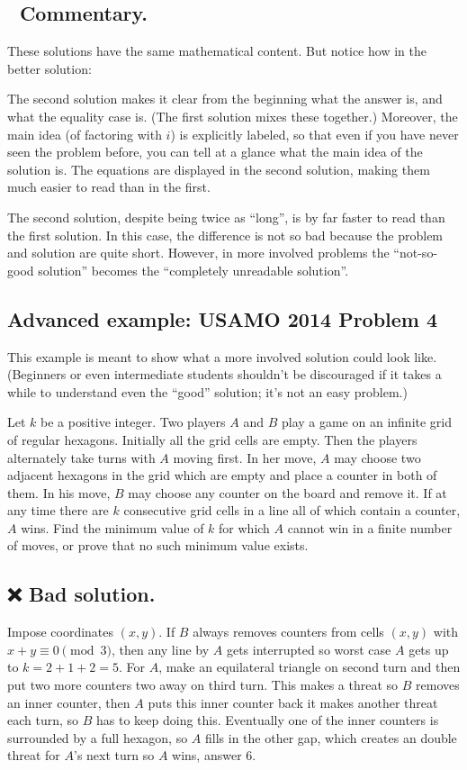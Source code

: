 \documentclass[11pt]{scrartcl}
\begin{document}
\subsection*{💬 Commentary.}
These solutions have the same mathematical content.
But notice how in the better solution:
\begin{itemize}
  \ii The second solution makes it clear
  from the beginning what the answer is, and what the equality case is.
  (The first solution mixes these together.)
  \ii Moreover, the main idea (of factoring with $i$) is explicitly labeled,
  so that even if you have never seen the problem before,
  you can tell at a glance what the main idea of the solution is.
  \ii The equations are displayed in the second solution,
  making them much easier to read than in the first.
\end{itemize}
The second solution, despite being twice as ``long'',
is by far faster to read than the first solution.
In this case, the difference is not so bad because the
problem and solution are quite short.
However, in more involved problems the ``not-so-good solution''
becomes the ``completely unreadable solution''.


\subsection{Advanced example: USAMO 2014 Problem 4}
This example is meant to show what a more involved solution could look like.
(Beginners or even intermediate students shouldn't be discouraged
if it takes a while to understand even the ``good'' solution; it's not an easy problem.)

\begin{example}
  Let $k$ be a positive integer.
  Two players $A$ and $B$ play a game on an infinite grid of regular hexagons.
  Initially all the grid cells are empty.
  Then the players alternately take turns with $A$ moving first.
  In her move, $A$ may choose two adjacent hexagons in the grid
  which are empty and place a counter in both of them.
  In his move, $B$ may choose any counter on the board and remove it.
  If at any time there are $k$ consecutive grid cells
  in a line all of which contain a counter, $A$ wins.
  Find the minimum value of $k$ for which $A$ cannot
  win in a finite number of moves, or prove that no such minimum value exists.
\end{example}

\subsection*{❌ Bad solution.}
Impose coordinates $(x,y)$.
If $B$ always removes counters from cells $(x,y)$ with $x + y \equiv 0 \pmod 3$,
then any line by $A$ gets interrupted so worst case $A$ gets up to $k=2+1+2=5$.
For $A$, make an equilateral triangle on second turn
and then put two more counters two away on third turn.
This makes a threat so $B$ removes an inner counter,
then $A$ puts this inner counter back it makes another threat each turn,
so $B$ has to keep doing this.
Eventually one of the inner counters is surrounded by a full hexagon,
so $A$ fills in the other gap,
which creates an double threat for $A$'s next turn so $A$ wins, answer $6$.
\end{document}
